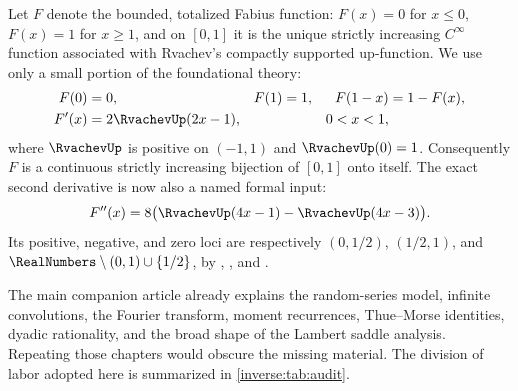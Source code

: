 \documentclass[11pt,oneside]{article}
\theoremstyle{definition}
\theoremstyle{remark}
\begin{document}
Let $F$ denote the bounded, totalized Fabius function: $F(x)=0$ for
$x\leq0$, $F(x)=1$ for $x\geq1$, and on $[0,1]$ it is the unique strictly
increasing $C^\infty$ function associated with Rvachev's compactly
supported up-function.  We use only a small portion of the foundational
theory:
\begin{align}
 F(0)&=0,&F(1)&=1,&F(1-x)&=1-F(x), \label{inverse:eq:F-basic}\\
 F'(x)&=2\RvachevUp(2x-1),&&&0<x<1, \label{inverse:eq:Fprime-up}
\end{align}
where $\RvachevUp$ is positive on $(-1,1)$ and $\RvachevUp(0)=1$.  Consequently $F$ is a
continuous strictly increasing bijection of $[0,1]$ onto itself.
The exact second derivative is now also a named formal input:
\[
 F''(x)=8\bigl(\RvachevUp(4x-1)-\RvachevUp(4x-3)\bigr).
\]
Its positive, negative, and zero loci are respectively \((0,1/2)\),
\((1/2,1)\), and \(\RealNumbers\setminus(0,1)\cup\{1/2\}\), by
,
, and
.

The main companion article already explains the random-series model,
infinite convolutions, the Fourier transform, moment recurrences,
Thue--Morse identities, dyadic rationality, and the broad shape of the
Lambert saddle analysis.  Repeating those chapters would obscure the
missing material.  The division of labor adopted here is summarized in
\cref{inverse:tab:audit}.
\end{document}
